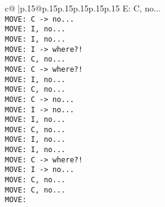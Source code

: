 \documentclass{article}
\begin{document}
{\begin{supertabular}{c@{$\;$}|p{.15\linewidth}@{}p{.15\linewidth}p{.15\linewidth}p{.15\linewidth}p{.15\linewidth}p{.15\linewidth}}
{{{E: C, no...\\ \tt  MOVE: C -> no...\\ \tt  MOVE: I, no...\\ \tt  MOVE: I, no...\\ \tt  MOVE: I -> where?!\\ \tt  MOVE: C, no...\\ \tt  MOVE: C -> where?!\\ \tt  MOVE: I, no...\\ \tt  MOVE: C, no...\\ \tt  MOVE: C -> no...\\ \tt  MOVE: I -> no...\\ \tt  MOVE: I, no...\\ \tt  MOVE: C, no...\\ \tt  MOVE: I, no...\\ \tt  MOVE: I, no...\\ \tt  MOVE: C -> where?!\\ \tt  MOVE: I -> no...\\ \tt  MOVE: C, no...\\ \tt  MOVE: C, no...\\ \tt  MOVE: }}}
\end{supertabular}}
\end{document}
